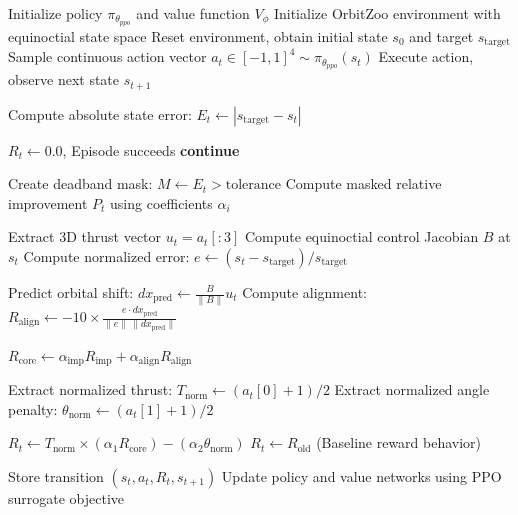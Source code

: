\documentclass[paper]{ieice}
\begin{document}
\begin{algorithm}[tb]
\caption{Direction-Aware PPO with Tolerance Masking}
\label{alg:jacobian_ppo}
\begin{algorithmic}[1]
\STATE Initialize policy $\pi_{\theta_{ppo}}$ and value function $V_{\phi}$
\STATE Initialize OrbitZoo environment with equinoctial state space
    \STATE Reset environment, obtain initial state $s_0$ and target $s_{\mathrm{target}}$
        \STATE Sample continuous action vector $a_t \in [-1, 1]^4 \sim \pi_{\theta_{ppo}}(s_t)$
        \STATE Execute action, observe next state $s_{t+1}$
        
        \STATE Compute absolute state error: $E_t \leftarrow |s_{\mathrm{target}} - s_t|$
        
            \STATE $R_t \leftarrow 0.0$, Episode succeeds
            \STATE \textbf{continue}
        \ENDIF
        
        \STATE Create deadband mask: $M \leftarrow E_t > \mathrm{tolerance}$
        \STATE Compute masked relative improvement $P_t$ using coefficients $\alpha_i$
        
            \STATE Extract 3D thrust vector $u_t = a_t[:3]$
            \STATE Compute equinoctial control Jacobian $B$ at $s_t$
            \STATE Compute normalized error: $e \leftarrow (s_t - s_{\mathrm{target}}) / s_{\mathrm{target}}$
            
            \STATE Predict orbital shift: $dx_{\mathrm{pred}} \leftarrow \frac{B}{\|B\|} u_t$
            \STATE Compute alignment: $R_{\mathrm{align}} \leftarrow -10 \times \frac{e \cdot dx_{\mathrm{pred}}}{\|e\|\,\|dx_{\mathrm{pred}}\|}$
            
            \STATE $R_{\mathrm{core}} \leftarrow \alpha_{\mathrm{imp}} R_{\mathrm{imp}} + \alpha_{\mathrm{align}} R_{\mathrm{align}}$
            
            \STATE Extract normalized thrust: $T_{\mathrm{norm}} \leftarrow (a_t[0] + 1) / 2$
            \STATE Extract normalized angle penalty: $\theta_{\mathrm{norm}} \leftarrow (a_t[1] + 1) / 2$
            
            \STATE $R_t \leftarrow T_{\mathrm{norm}} \times (\alpha_1 R_{\mathrm{core}}) - (\alpha_2 \theta_{\mathrm{norm}})$
        \ELSE
            \STATE $R_t \leftarrow R_{\mathrm{old}}$ (Baseline reward behavior)
        \ENDIF
        
        \STATE Store transition $(s_t, a_t, R_t, s_{t+1})$
    \ENDFOR
    \STATE Update policy and value networks using PPO surrogate objective
\ENDFOR
\end{algorithmic}
\end{algorithm}
\end{document}
